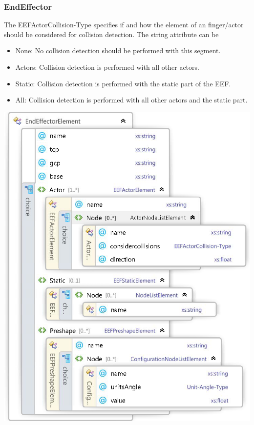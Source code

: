 \subsubsection{EndEffector}
The EEFActorCollision-Type specifies if and how the element of an finger/actor should be considered for collision detection. The string attribute can be 
\begin{itemize}
\item None: No collision detection should be performed with this segment. 
\item Actors: Collision detection is performed with all other actors. 
\item Static: Collision detection is performed with the static part of the EEF. 
\item All: Collision detection is performed with all other actors and the static part. 
\end{itemize}
\includegraphics[width=\textwidth]{Xsd_EEF_open} 
